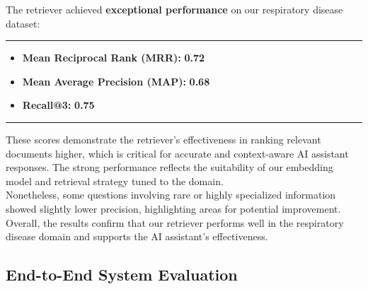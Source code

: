 \clearpage 
The retriever achieved \textbf{exceptional performance} on our respiratory disease dataset:
\vspace{0.5em}
\hrule
\begin{itemize}
    \item \textbf{Mean Reciprocal Rank (MRR):} \textbf{0.72} 
    \item \textbf{Mean Average Precision (MAP):} \textbf{0.68}
    \item \textbf{Recall@3:} \textbf{0.75}
\end{itemize}
\hrule
\vspace{0.5em}

These scores demonstrate the retriever’s effectiveness in ranking relevant documents higher, which is critical for accurate and context-aware AI assistant responses. The strong performance reflects the suitability of our embedding model and retrieval strategy tuned to the domain.\\
Nonetheless, some questions involving rare or highly specialized information showed slightly lower precision, highlighting areas for potential improvement. Overall, the results confirm that our retriever performs well in the respiratory disease domain and supports the AI assistant’s effectiveness.

\subsection{End-to-End System Evaluation}
\label{subsec:e2e-eval}

